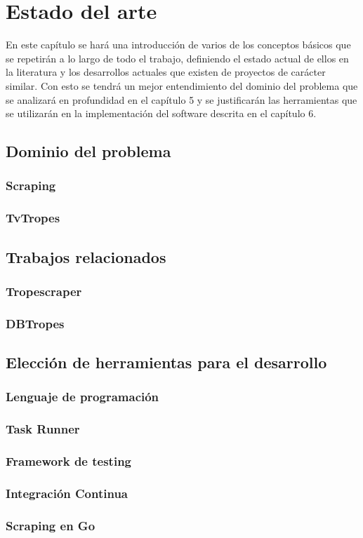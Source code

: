 \chapter{Estado del arte}

En este capítulo se hará una introducción de varios de los conceptos básicos que se repetirán a lo largo de todo el trabajo, definiendo el estado actual de ellos en la literatura y los desarrollos actuales que existen de proyectos de carácter similar. Con esto se tendrá un mejor entendimiento del dominio del problema que se analizará en profundidad en el capítulo 5 y se justificarán las herramientas que se utilizarán en la implementación del software descrita en el capítulo 6.

\section{Dominio del problema}
\subsection{Scraping}
\subsection{TvTropes}
\section{Trabajos relacionados}
\subsection{Tropescraper}
\subsection{DBTropes}
\section{Elección de herramientas para el desarrollo}
\subsection{Lenguaje de programación}
\subsection{Task Runner}
\subsection{Framework de testing}
\subsection{Integración Continua}
\subsection{Scraping en Go}